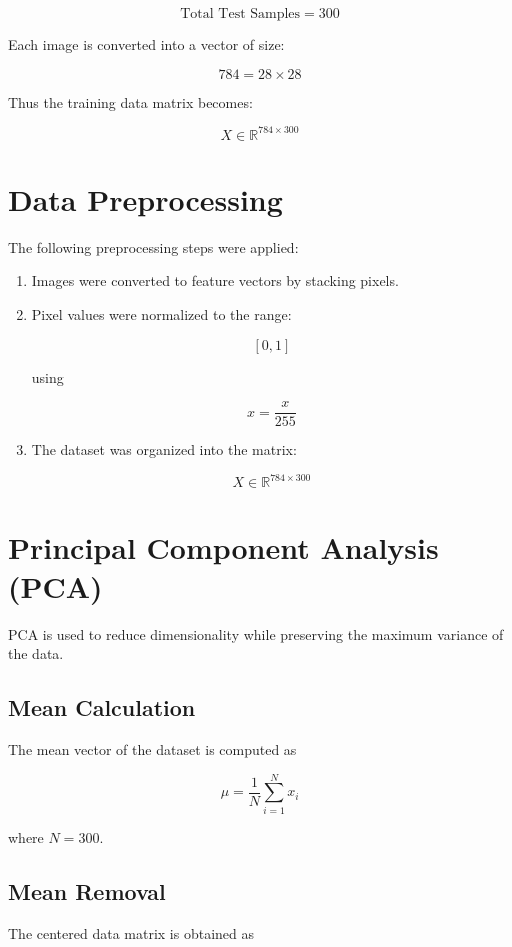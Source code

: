\documentclass[12pt]{article}
\begin{document}
\[
\text{Total Test Samples} = 300
\]

Each image is converted into a vector of size:

\[
784 = 28 \times 28
\]

Thus the training data matrix becomes:

\[
X \in \mathbb{R}^{784 \times 300}
\]

\section{Data Preprocessing}

The following preprocessing steps were applied:

\begin{enumerate}

\item Images were converted to feature vectors by stacking pixels.
\item Pixel values were normalized to the range:

\[
[0,1]
\]

using

\[
x = \frac{x}{255}
\]

\item The dataset was organized into the matrix:

\[
X \in \mathbb{R}^{784 \times 300}
\]

\end{enumerate}

\section{Principal Component Analysis (PCA)}

PCA is used to reduce dimensionality while preserving the maximum variance of the data.

\subsection{Mean Calculation}

The mean vector of the dataset is computed as

\[
\mu = \frac{1}{N}\sum_{i=1}^{N}x_i
\]

where $N=300$.

\subsection{Mean Removal}

The centered data matrix is obtained as
\end{document}

